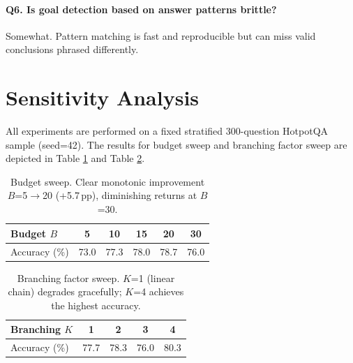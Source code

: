 \documentclass[11pt]{article}
\begin{document}
{\paragraph{Q6. Is goal detection based on answer patterns brittle?}
Somewhat. Pattern matching is fast and reproducible but can miss valid conclusions phrased differently.

\section{Sensitivity Analysis}
\label{app:sensitivity}

All experiments are performed on a fixed stratified 300-question HotpotQA sample (seed=42). The results for budget sweep and branching factor sweep are depicted in Table \ref{tab:sensitivity_budget} and Table \ref{tab:sensitivity_branch}.

\begin{table}[ht]
\centering
\small
\begin{tabular}{lccccc}
\toprule
\textbf{Budget $B$} & 5 & 10 & 15 & 20 & 30 \\
\midrule
Accuracy (\%) & 73.0 & 77.3 & 78.0 & 78.7 & 76.0 \\
\bottomrule
\end{tabular}
\caption{Budget sweep. Clear monotonic improvement $B$=5$\to$20 (+5.7\,pp), diminishing returns at $B$=30.}
\label{tab:sensitivity_budget}
\end{table}

\begin{table}[ht]
\centering
\small
\begin{tabular}{lcccc}
\toprule
\textbf{Branching $K$} & 1 & 2 & 3 & 4 \\
\midrule
Accuracy (\%) & 77.7 & 78.3 & 76.0 & 80.3 \\
\bottomrule
\end{tabular}
\caption{Branching factor sweep. $K$=1 (linear chain) degrades gracefully; $K$=4 achieves the highest accuracy.}
\label{tab:sensitivity_branch}
\end{table}

}
\end{document}
